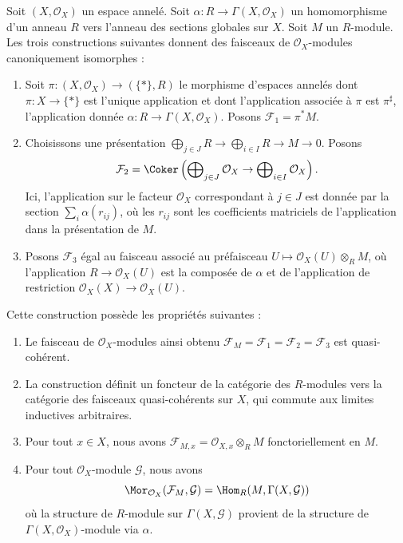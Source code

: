 \begin{lemma}
\label{lemma-construct-quasi-coherent-sheaves}
Soit $(X, \mathcal{O}_X)$ un espace annelé.
Soit $\alpha : R \to \Gamma(X, \mathcal{O}_X)$ un homomorphisme d'un anneau
$R$ vers l'anneau des sections globales sur $X$.
Soit $M$ un $R$-module.
Les trois constructions suivantes donnent des faisceaux de
$\mathcal{O}_X$-modules canoniquement isomorphes :
\begin{enumerate}
\item Soit $\pi : (X, \mathcal{O}_X) \longrightarrow (\{*\}, R)$
le morphisme d'espaces annelés dont $\pi : X \to \{*\}$ est l'unique
application et dont l'application associée à $\pi$ est $\pi^\sharp$,
l'application donnée
$\alpha : R \to \Gamma(X, \mathcal{O}_X)$. Posons $\mathcal{F}_1 = \pi^*M$.
\item Choisissons une présentation
$\bigoplus_{j \in J} R \to \bigoplus_{i \in I} R \to M \to 0$.
Posons
$$
\mathcal{F}_2 = \Coker\left(
\bigoplus\nolimits_{j \in J} \mathcal{O}_X
\to
\bigoplus\nolimits_{i \in I} \mathcal{O}_X
\right).
$$
Ici, l'application sur le facteur $\mathcal{O}_X$ correspondant à $j \in J$
est donnée par la section $\sum_i \alpha(r_{ij})$, où les $r_{ij}$
sont les coefficients matriciels de l'application dans la présentation de $M$.
\item Posons $\mathcal{F}_3$ égal au faisceau associé au préfaisceau
$U \mapsto \mathcal{O}_X(U) \otimes_R M$, où l'application
$R \to \mathcal{O}_X(U)$ est la composée de $\alpha$ et de
l'application de restriction $\mathcal{O}_X(X) \to \mathcal{O}_X(U)$.
\end{enumerate}
Cette construction possède les propriétés suivantes :
\begin{enumerate}
\item Le faisceau de $\mathcal{O}_X$-modules ainsi obtenu
$\mathcal{F}_M = \mathcal{F}_1 = \mathcal{F}_2 = \mathcal{F}_3$
est quasi-cohérent.
\item La construction définit un foncteur de la catégorie des $R$-modules
vers la catégorie des faisceaux quasi-cohérents sur $X$, qui commute aux
limites inductives arbitraires.
\item Pour tout $x \in X$, nous avons
$\mathcal{F}_{M, x} = \mathcal{O}_{X, x} \otimes_R M$
fonctoriellement en $M$.
\item Pour tout $\mathcal{O}_X$-module
$\mathcal{G}$, nous avons
$$
\Mor_{\mathcal{O}_X}(\mathcal{F}_M, \mathcal{G})
=
\Hom_R(M, \Gamma(X, \mathcal{G}))
$$
où la structure de $R$-module sur $\Gamma(X, \mathcal{G})$
provient de la structure de $\Gamma(X, \mathcal{O}_X)$-module via
$\alpha$.
\end{enumerate}
\end{lemma}

